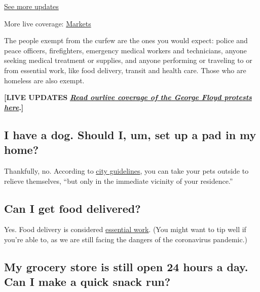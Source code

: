 \href{https://www.nytimes3xbfgragh.onion/2020/09/11/world/covid-19-coronavirus.html?action=click\&pgtype=Article\&state=default\&region=MAIN_CONTENT_1\&context=storylines_live_updates}{See
more updates}

More live coverage:
\href{https://www.nytimes3xbfgragh.onion/live/2020/09/11/business/stock-market-today-coronavirus?action=click\&pgtype=Article\&state=default\&region=MAIN_CONTENT_1\&context=storylines_live_updates}{Markets}

The people exempt from the curfew are the ones you would expect: police
and peace officers, firefighters, emergency medical workers and
technicians, anyone seeking medical treatment or supplies, and anyone
performing or traveling to or from essential work, like food delivery,
transit and health care. Those who are homeless are also exempt.

\textbf{{[}LIVE UPDATES}
\textbf{\href{https://www.nytimes3xbfgragh.onion/2020/06/02/nyregion/nyc-protests-george-floyd.html}{\emph{Read
our}}\href{https://www.nytimes3xbfgragh.onion/2020/06/02/nyregion/nyc-protests-george-floyd.html}{}\href{https://www.nytimes3xbfgragh.onion/2020/06/02/nyregion/nyc-protests-george-floyd.html}{\emph{live
coverage of the George Floyd protests here}}.{]}}

\hypertarget{i-have-a-dog-should-i-um-set-up-a-pad-in-my-home}{%
\subsection{I have a dog. Should I, um, set up a pad in my
home?}\label{i-have-a-dog-should-i-um-set-up-a-pad-in-my-home}}

Thankfully, no. According to
\href{https://www1.nyc.gov/assets/counseltothemayor/downloads/Curfew-FAQ.pdf}{city
guidelines}, you can take your pets outside to relieve themselves, ``but
only in the immediate vicinity of your residence.''

\hypertarget{can-i-get-food-delivered}{%
\subsection{Can I get food delivered?}\label{can-i-get-food-delivered}}

Yes. Food delivery is considered
\href{https://esd.ny.gov/guidance-executive-order-2026}{essential work}.
(You might want to tip well if you're able to, as we are still facing
the dangers of the coronavirus pandemic.)

\hypertarget{my-grocery-store-is-still-open-24-hours-a-day-can-i-make-a-quick-snack-run}{%
\subsection{My grocery store is still open 24 hours a day. Can I make a
quick snack
run?}\label{my-grocery-store-is-still-open-24-hours-a-day-can-i-make-a-quick-snack-run}}

